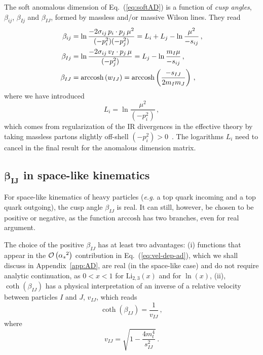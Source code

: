 \documentclass[a4paper,11pt]{article}
\newcommand{\as}{{\alpha_s}}
\newcommand{\eg}{{\it e.g. }}
\newcommand{\order}[1]{{{\cal O}\left(#1\right)}}
\newcommand{\Li}{{\text{Li}}}
\newcommand{\betaIJ}{\beta_{IJ}}
\newcommand{\vIJ}{v_{IJ}}
\numberwithin{equation}{section}
\begin{document}
The soft anomalous dimension of Eq.~(\ref{eq:softAD}) is a function of
\emph{cusp angles}, $\beta_{ij}$, $\beta_{Ij}$ and $\beta_{IJ}$, formed by
massless and/or massive Wilson lines. They read~\cite{Becher:2009kw}
%
\begin{subequations}
  \begin{align}
    \beta_{ij} & = 
    \ln \frac{-2 \sigma_{ij}\, p_i \cdot p_j\, \mu^2}{(-p_i^2)(-p_j^2)} =
    L_i + L_j - \ln\frac{\mu^2}{-s_{ij}}\,,
    \\
    \beta_{Ij} & = 
    \ln \frac{-2 \sigma_{ij}\, v_I \cdot p_j\, \mu}{(-p_j^2)} =
    L_j - \ln\frac{m_I \mu}{-s_{ij}}\,,
    \\
   \label{eq:betaIJ-def}
    \beta_{IJ} & =  {\rm arccosh} \left(w_{IJ}\right) = 
                    {\rm arccosh} \left(\frac{-s_{IJ}}{2 m_I m_J}\right)\,,
  \end{align}
\end{subequations}
%
where we have introduced
%
\begin{equation}
  L_i = \ln \frac{\mu^2}{(-p_i^2)}\,,
\end{equation}
%
which comes from regularization of the IR divergences in the effective theory by
taking massless partons slightly off-shell $(-p_i^2) > 0$~\cite{Becher:2009qa}.
The logarithms $L_i$ need to cancel in the final result for the anomalous
dimension matrix.


\subsection*{$\mathbold{\betaIJ}$ in space-like kinematics}

For space-like kinematics of heavy particles (\eg a top quark incoming and a top
quark outgoing), the cusp angle $\beta_{IJ}$ is real. It can still, however, be
chosen to be positive or negative, as the function $\text{arccosh}$ has two
branches, even for real argument. 

The choice of the positive $\betaIJ$ has at least two advantages: (i)
functions that appear in the $\order{\as^2}$ contribution in
Eq.~(\ref{eq:vel-dep-ad}), which we shall discuss in Appendix~\ref{app:AD}, are real (in the space-like case) and do not require
analytic continuation, as $0 < x < 1$ for $\Li_{2,3}(x)$ and for $\ln(x)$, (ii),
$\coth(\betaIJ)$ has a physical interpretation of an inverse of a relative
velocity between particles $I$ and $J$, $\vIJ$, which reads
%
\begin{equation}
  \coth(\betaIJ) = \frac{1}{\vIJ}\,,
  \label{eq:cothbetaIJ}
\end{equation}
%
where
%
\begin{equation}
  v_{IJ} = \sqrt{1- \frac{4 m_t^4}{s_{IJ}^2}}\,.
\end{equation}
%
\end{document}
